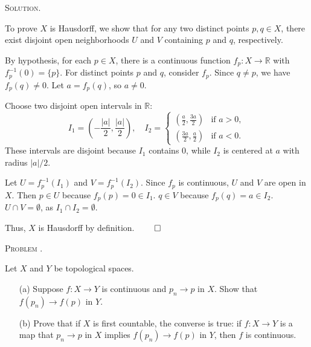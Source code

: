 \documentclass[12pt, a4paper, oneside]{ctexart}
\newcounter{problemname}
\newenvironment{problem}{\begin{framed}\stepcounter{problemname}\par\noindent\textsc{Problem \arabic{problemname}. }}{\end{framed}\par}
\newenvironment{solution}{%
	\par\noindent\textsc{Solution. }\ignorespaces
}{%
	\hfill$\qed$\par
}
\begin{document}
	\begin{solution}
		To prove \( X \) is Hausdorff, we show that for any two distinct points \( p, q \in X \), there exist disjoint open neighborhoods \( U \) and \( V \) containing \( p \) and \( q \), respectively.
		
		
			By hypothesis, for each \( p \in X \), there is a continuous function \( f_p: X \to \mathbb{R} \) with \( f_p^{-1}(0) = \{p\} \). For distinct points \( p \) and \( q \), consider \( f_p \). Since \( q \neq p \), we have \( f_p(q) \neq 0 \). Let \( a = f_p(q) \), so \( a \neq 0 \).
			
			 
			Choose two disjoint open intervals in \( \mathbb{R} \):
			\[
			I_1 = \left(-\frac{|a|}{2}, \frac{|a|}{2}\right), \quad I_2 = 
			\begin{cases}
				\left(\frac{a}{2}, \frac{3a}{2}\right) & \text{if } a > 0, \\
				\left(\frac{3a}{2}, \frac{a}{2}\right) & \text{if } a < 0.
			\end{cases}
			\]
			These intervals are disjoint because \( I_1 \) contains \( 0 \), while \( I_2 \) is centered at \( a \) with radius \( |a|/2 \).
			
		
			Let \( U = f_p^{-1}(I_1) \) and \( V = f_p^{-1}(I_2) \). Since \( f_p \) is continuous, \( U \) and \( V \) are open in \( X \). Then \( p \in U \) because \( f_p(p) = 0 \in I_1 \).
			\( q \in V \) because \( f_p(q) = a \in I_2 \).
			\( U \cap V = \emptyset \), as \( I_1 \cap I_2 = \emptyset \).
			
		
		Thus, \( X \) is Hausdorff by definition.
	\end{solution}
	
	\begin{problem}
		
		
	Let $X$ and $Y$ be topological spaces.
	
	\begin{itemize}
		\item[(a)] Suppose $f : X \to Y$ is continuous and $p_n \to p$ in $X$. Show that $f(p_n) \to f(p)$ in $Y$.
		\item[(b)] Prove that if $X$ is first countable, the converse is true: if $f : X \to Y$ is a map that $p_n \to p$ in $X$ implies $f(p_n) \to f(p)$ in $Y$, then $f$ is continuous.
	\end{itemize}

	\end{problem}
	
\end{document}
